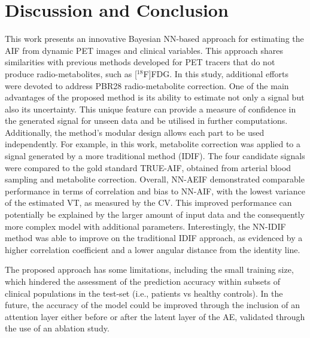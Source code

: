 \vspace{-0.5cm}

\section{Discussion and Conclusion} \label{sec:discussion}
    This work presents an innovative Bayesian \gls{NN}-based approach for estimating the \gls{AIF} from dynamic \gls{PET} images and clinical variables. This approach shares similarities with previous methods developed for \gls{PET} tracers that do not produce radio-metabolites, such as [$^{18}$F]\gls{FDG}. In this study, additional efforts were devoted to address \gls{PBR28} radio-metabolite correction. One of the main advantages of the proposed method is its ability to estimate not only a signal but also its uncertainty. This unique feature can provide a measure of confidence in the generated signal for unseen data and be utilised in further computations. Additionally, the method's modular design allows each part to be used independently. For example, in this work, metabolite correction was applied to a signal generated by a more traditional method (\gls{IDIF}). The four candidate signals were compared to the gold standard TRUE-\gls{AIF}, obtained from arterial blood sampling and metabolite correction. Overall, \gls{NN}-\gls{AE}\gls{IF} demonstrated comparable performance in terms of correlation and bias to \gls{NN}-\gls{AIF}, with the lowest variance of the estimated \gls{VT}, as measured by the \gls{CV}. This improved performance can potentially be explained by the larger amount of input data and the consequently more complex model with additional parameters. Interestingly, the \gls{NN}-\gls{IDIF} method was able to improve on the traditional \gls{IDIF} approach, as evidenced by a higher correlation coefficient and a lower angular distance from the identity line.
    
    The proposed approach has some limitations, including the small training size, which hindered the assessment of the prediction accuracy within subsets of clinical populations in the test-set (i.e., patients vs healthy controls).  In the future, the accuracy of the model could be improved through the inclusion of an attention layer either before or after the latent layer of the \gls{AE}, validated through the use of an ablation study. 
